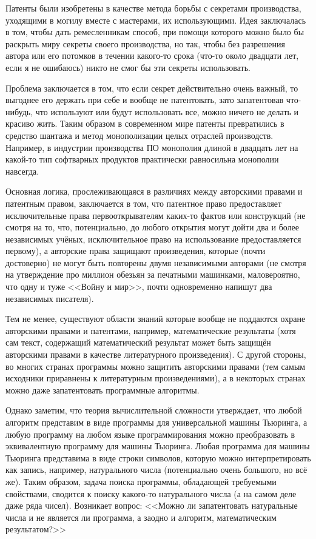 Патенты были изобретены в качестве метода борьбы с секретами производства, уходящими в могилу вместе с мастерами, их использующими.
Идея заключалась в том, чтобы дать ремесленникам способ, при помощи которого можно было бы раскрыть миру секреты своего производства, но так, чтобы без разрешения автора или его потомков в течении какого-то срока (что-то около двадцати лет, если я не ошибаюсь) никто не смог бы эти секреты использовать.

Проблема заключается в том, что если секрет действительно очень важный, то выгоднее его держать при себе и вообще не патентовать, зато запатентовав что-нибудь, что используют или будут использовать все, можно ничего не делать и красиво жить.
Таким образом в современном мире патенты превратились в средство шантажа и метод монополизации целых отраслей производств.
Например, в индустрии производства ПО монополия длиной в двадцать лет на какой-то тип софтварных продуктов практически равносильна монополии навсегда.

Основная логика, прослеживающаяся в различиях между авторскими правами и патентным правом, заключается в том, что патентное право предоставляет исключительные права первооткрывателям каких-то фактов или конструкций (не смотря на то, что, потенциально, до любого открытия могут дойти два и более независимых учёных, исключительное право на использование предоставляется первому), а авторские права защищают произведения, которые (почти достоверно) не могут быть повторены двумя независимыми авторами (не смотря на утверждение про миллион обезьян за печатными машинками, маловероятно, что одну и туже <<Войну и мир>>, почти одновременно напишут два независимых писателя).

Тем не менее, существуют области знаний которые вообще не поддаются охране авторскими правами и патентами, например, математические результаты (хотя сам текст, содержащий математический результат может быть защищён авторскими правами в качестве литературного произведения).
С другой стороны, во многих странах программы можно защитить авторскими правами (тем самым исходники приравнены к литературным произведениями), а в некоторых странах можно даже запатентовать программные алгоритмы.

Однако заметим, что теория вычислительной сложности утверждает, что любой алгоритм представим в виде программы для универсальной машины Тьюринга, а любую программу на любом языке программирования можно преобразовать в эквивалентную программу для машины Тьюринга.
Любая программа для машины Тьюринга представима в виде строки символов, которую можно интерпретировать как запись, например, натурального числа (потенциально очень большого, но всё же).
Таким образом, задача поиска программы, обладающей требуемыми свойствами, сводится к поиску какого-то натурального числа (а на самом деле даже ряда чисел).
Возникает вопрос: <<Можно ли запатентовать натуральные числа и не является ли программа, а заодно и алгоритм, математическим результатом?>>

